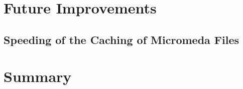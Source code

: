 \section{Future Improvements}

\subsection{Speeding of the Caching of Micromeda Files}

\section{Summary}
